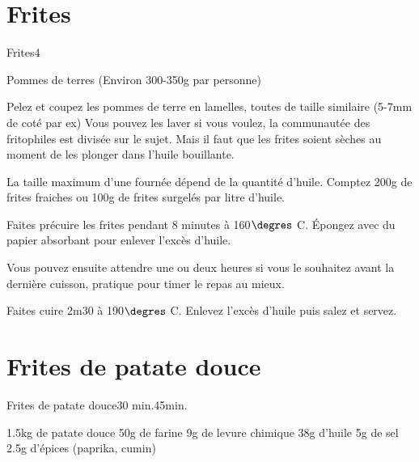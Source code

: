 {\section{Frites}
\begin{recette}{Frites}{4}{}{}
\begin{ingredients}
\ingredient Pommes de terres (Environ 300-350g par personne)
\end{ingredients}

\begin{preparation}
\etape Pelez et coupez les pommes de terre en lamelles, toutes de taille similaire (5-7mm de coté par ex)
\etape Vous pouvez les laver si vous voulez, la communautée des fritophiles est divisée sur le sujet. Mais il faut que les frites soient sèches au moment de les plonger dans l'huile bouillante.
\end{preparation}

\begin{cuisson}
La taille maximum d'une fournée dépend de la quantité d'huile. Comptez 200g de frites fraiches ou 100g de frites surgelés par litre d'huile. 

Faites précuire les frites pendant 8 minutes à 160$\degres$ C. Épongez avec du papier absorbant pour enlever l'excès d'huile. 

Vous pouvez ensuite attendre une ou deux heures si vous le souhaitez avant la dernière cuisson, pratique pour timer le repas au mieux. 

Faites cuire 2m30 à 190$\degres$ C. Enlevez l'excès d'huile puis salez et servez. 
\end{cuisson}
\end{recette}


\section{Frites de patate douce}
\begin{recette}{Frites de patate douce}{}{30 min.}{45min.}
\begin{ingredients}
\ingredient 1.5kg de patate douce
\ingredient 50g de farine
\ingredient 9g de levure chimique
\ingredient 38g d'huile
\ingredient 5g de sel
\ingredient 2.5g d'épices (paprika, cumin)
\end{ingredients}


\end{recette}}
